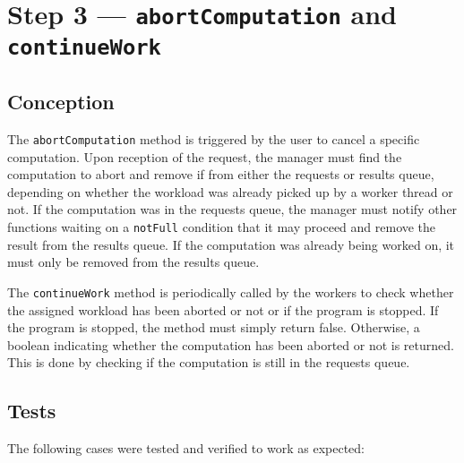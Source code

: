 \documentclass{article}
\begin{document}
    \pagebreak

    \section*{Step 3 --- \texttt{abortComputation} and \texttt{continueWork}}

    \subsection*{Conception}

    The \texttt{abortComputation} method is triggered by the user to cancel a specific computation.
    Upon reception of the request, the manager must find the computation to abort and remove if from either the requests or results queue, depending
    on whether the workload was already picked up by a worker thread or not.
    If the computation was in the requests queue, the manager must notify other functions waiting on a \texttt{notFull} condition that it may proceed and remove the result from the results queue.
    If the computation was already being worked on, it must only be removed from the results queue.

    The \texttt{continueWork} method is periodically called by the workers to check whether the assigned workload has been aborted or not or if the program is stopped.
    If the program is stopped, the method must simply return false.
    Otherwise, a boolean indicating whether the computation has been aborted or not is returned.
    This is done by checking if the computation is still in the requests queue.

    \subsection*{Tests}

    The following cases were tested and verified to work as expected:
\end{document}
